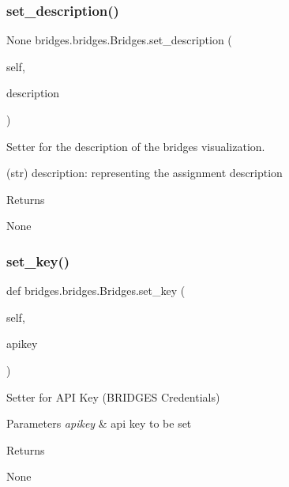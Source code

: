 \mbox{\label{classbridges_1_1bridges_1_1_bridges_ac61a47f230c8f96f85d810498fad8b97}} 
\subsubsection{\texorpdfstring{set\_description()}{set\_description()}}
{\footnotesize\ttfamily  None bridges.\+bridges.\+Bridges.\+set\+\_\+description (\begin{DoxyParamCaption}\item[{}]{self,  }\item[{}]{description }\end{DoxyParamCaption})}



Setter for the description of the bridges visualization. 

\begin{DoxyVerb}       (str) description: representing the assignment description
\end{DoxyVerb}
 \begin{DoxyReturn}{Returns}


None 
\end{DoxyReturn}
\mbox{\label{classbridges_1_1bridges_1_1_bridges_a5841bc54e3663249e76f4b34f5a3a593}} 
\subsubsection{\texorpdfstring{set\_key()}{set\_key()}}
{\footnotesize\ttfamily def bridges.\+bridges.\+Bridges.\+set\+\_\+key (\begin{DoxyParamCaption}\item[{}]{self,  }\item[{}]{apikey }\end{DoxyParamCaption})}



Setter for A\+PI Key (B\+R\+I\+D\+G\+ES Credentials) 


\begin{DoxyParams}{Parameters}
{\em apikey} & api key to be set \\
\hline
\end{DoxyParams}
\begin{DoxyReturn}{Returns}


None 
\end{DoxyReturn}
\mbox{\label{classbridges_1_1bridges_1_1_bridges_ae9ed34b5878d9d120949da0b7e4d2911}} 
